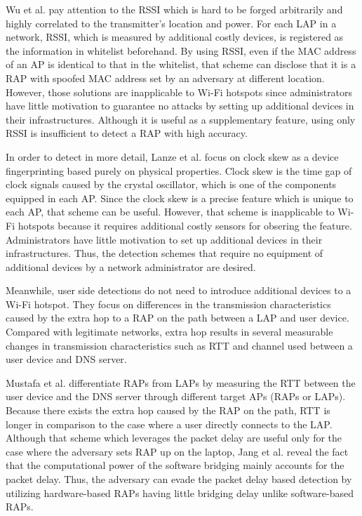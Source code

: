 \documentclass[conference]{IEEEtran}
\begin{document}
Wu et al. \cite{prapd} pay attention to the RSSI which is hard to be forged arbitrarily and highly correlated to the transmitter's location and power.
For each LAP in a network, RSSI, which is measured by additional costly devices, is registered as the information in whitelist beforehand.
By using RSSI, even if the MAC address of an AP is identical to that in the whitelist, that scheme can disclose that it is a RAP with spoofed MAC address set by an adversary at different location.
However, those solutions are inapplicable to Wi-Fi hotspots since administrators have little motivation to guarantee no attacks by setting up additional devices in their infrastructures.
Although it is useful as a supplementary feature, using only RSSI is insufficient to detect a RAP with high accuracy.

In order to detect in more detail, Lanze et al. \cite{clockskew} focus on clock skew as a device fingerprinting based purely on physical properties.
Clock skew is the time gap of clock signals caused by the crystal oscillator, which is one of the components equipped in each AP.
Since the clock skew is a precise feature which is unique to each AP, that scheme can be useful.
However, that scheme is inapplicable to Wi-Fi hotspots because it requires additional costly sensors for obsering the feature.
Administrators have little motivation to set up additional devices in their infrastructures.
Thus, the detection schemes that require no equipment of additional devices by a network administrator are desired.

Meanwhile, user side detections do not need to introduce additional devices to a Wi-Fi hotspot.
They focus on differences in the transmission characteristics caused by the extra hop to a RAP on the path between a LAP and user device. 
Compared with legitimate networks, extra hop results in several measurable changes in transmission characteristics such as RTT and channel used between a user device and DNS server.

Mustafa et al. \cite{rtt} differentiate RAPs from LAPs by measuring the RTT between the user device and the DNS server through different target APs (RAPs or LAPs).
Because there exists the extra hop caused by the RAP on the path, RTT is longer in comparison to the case where a user directly connects to the LAP.
Although that scheme which leverages the packet delay are useful only for the case where the adversary sets RAP up on the laptop, Jang et al. \cite{previous} reveal the fact that the computational power of the software bridging mainly accounts for the packet delay.
Thus, the adversary can evade the packet delay based detection by utilizing hardware-based RAPs having little bridging delay unlike software-based RAPs.
\end{document}
